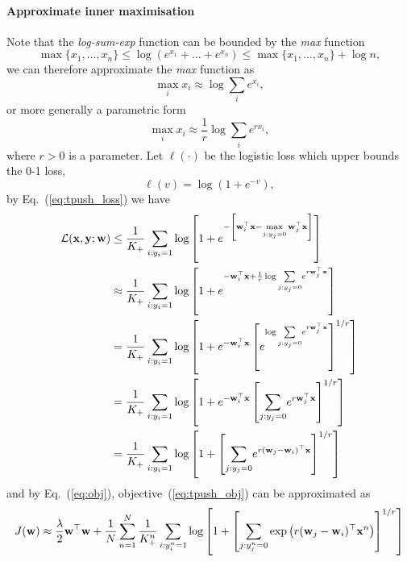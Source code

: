 \paragraph{Approximate inner maximisation}
Note that the \emph{log-sum-exp} function can be bounded by the \emph{max} function~\cite[p. 72]{boyd2004convex}
$$
\max\{x_1, \dots, x_n\} \le \log(e^{x_1} + \dots + e^{x_n}) \le \max\{x_1, \dots, x_n\} + \log n,
$$
we can therefore approximate the \emph{max} function as
$$
\max_i x_i \approx \log \sum_i e^{x_i},
$$
or more generally a parametric form
$$
\max_i x_i \approx \frac{1}{r} \log \sum_i e^{r x_i},
$$
where $r > 0$ is a parameter.
%
Let $\ell(\cdot)$ be the logistic loss which upper bounds the 0-1 loss, \ie 
$$
\ell(v) = \log(1 + e^{-v}),
$$
by Eq.~(\ref{eq:tpush_loss}) we have
%
\begin{equation}
\label{eq:tpush_loss_approx}
\begin{aligned}
\mathcal{L}(\mathbf{x}, \mathbf{y}; \mathbf{w})
&\le \frac{1}{K_+} \sum_{i:y_i=1}
     \log \left[ 1 + e^{- \left[ \mathbf{w}_i^\top \mathbf{x} - \underset{j:y_j=0}{\max} \, \mathbf{w}_j^\top \mathbf{x} \right]} \right] \\
&\approx \frac{1}{K_+} \sum_{i:y_i=1}
         \log \left[ 1 + e^{-\mathbf{w}_i^\top \mathbf{x} + \frac{1}{r} \log \underset{j:y_j=0}{\sum} e^{r \mathbf{w}_j^\top \mathbf{x}}} \right] \\
&= \frac{1}{K_+} \sum_{i:y_i=1}
   \log \left[ 1 + e^{-\mathbf{w}_i^\top \mathbf{x}} \left[ e^{\log \underset{j:y_j=0}{\sum} e^{r \mathbf{w}_j^\top \mathbf{x}}} \right]^{1/r} \right] \\
&= \frac{1}{K_+} \sum_{i:y_i=1}
   \log \left[ 1 + e^{-\mathbf{w}_i^\top \mathbf{x}} \left[ \underset{j:y_j=0}{\sum} e^{r \mathbf{w}_j^\top \mathbf{x}} \right]^{1/r} \right] \\
&= \frac{1}{K_+} \sum_{i:y_i=1}
   \log \left[ 1 + \left[ \underset{j:y_j=0}{\sum} e^{r (\mathbf{w}_j - \mathbf{w}_i)^\top \mathbf{x}} \right]^{1/r} \right]
\end{aligned}
\end{equation}
and by Eq.~(\ref{eq:obj}), objective~(\ref{eq:tpush_obj}) can be approximated as
\begin{equation}
\label{eq:tpush_obj_approx}
J(\mathbf{w}) \approx \frac{\lambda}{2} \mathbf{w}^\top \mathbf{w} + \frac{1}{N} \sum_{n=1}^N \frac{1}{K_+^n} \sum_{i:y_i^n=1}
              \log \left[ 1 + \left[ \underset{j:y_j^n=0}{\sum} \exp \left( r (\mathbf{w}_j - \mathbf{w}_i)^\top \mathbf{x}^n \right) \right]^{1/r} \right]
\end{equation}

